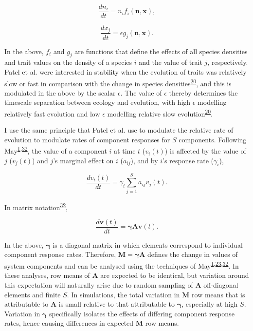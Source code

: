 \documentclass[]{article}
\begin{document}
\[\frac{dn_{i}}{dt} = n_{i}f_{i}(\mathbf{n}, \mathbf{x}),\]

\[\frac{dx_{j}}{dt} = \epsilon g_{j}(\mathbf{n}, \mathbf{x}).\]

In the above, \(f_{i}\) and \(g_{j}\) are functions that define the
effects of all species densities and trait values on the density of a
species \(i\) and the value of trait \(j\), respectively. Patel et al.
were interested in stability when the evolution of traits was relatively
slow or fast in comparison with the change in species
densities\textsuperscript{\protect\hyperlink{ref-Patel2018}{20}}, and
this is modulated in the above by the scalar \(\epsilon\). The value of
\(\epsilon\) thereby determines the timescale separation between ecology
and evolution, with high \(\epsilon\) modelling relatively fast
evolution and low \(\epsilon\) modelling relative slow
evolution\textsuperscript{\protect\hyperlink{ref-Patel2018}{20}}.

I use the same principle that Patel et al. use to modulate the relative
rate of evolution to modulate rates of component responses for \(S\)
components. Following
May\textsuperscript{\protect\hyperlink{ref-May1972}{1},\protect\hyperlink{ref-May1973}{32}},
the value of a component \(i\) at time \(t\) (\(v_{i}(t)\)) is affected
by the value of \(j\) (\(v_{j}(t)\)) and \(j\)'s marginal effect on
\(i\) (\(a_{ij}\)), and by \(i\)'s response rate (\(\gamma_{i}\)),

\[\frac{dv_{i}(t)}{dt} = \gamma_{i} \sum_{j=1}^{S}a_{ij}v_{j}(t).\]

In matrix notation\textsuperscript{\protect\hyperlink{ref-May1973}{32}},

\[\frac{d\mathbf{v}(t)}{dt} = \boldsymbol{\gamma} \mathbf{A}\mathbf{v}(t).\]

In the above, \(\boldsymbol{\gamma}\) is a diagonal matrix in which
elements correspond to individual component response rates. Therefore,
\(\mathbf{M} = \boldsymbol{\gamma} \mathbf{A}\) defines the change in
values of system components and can be analysed using the techniques of
May\textsuperscript{\protect\hyperlink{ref-May1972}{1},\protect\hyperlink{ref-Ahmadian2015}{23},\protect\hyperlink{ref-May1973}{32}}.
In these analyses, row means of \(\mathbf{A}\) are expected to be
identical, but variation around this expectation will naturally arise
due to random sampling of \(\mathbf{A}\) off-diagonal elements and
finite \(S\). In simulations, the total variation in \(\mathbf{M}\) row
means that is attributable to \(\mathbf{A}\) is small relative to that
attributable to \(\boldsymbol{\gamma}\), especially at high \(S\).
Variation in \(\boldsymbol{\gamma}\) specifically isolates the effects
of differing component response rates, hence causing differences in
expected \(\mathbf{M}\) row means.
\end{document}
